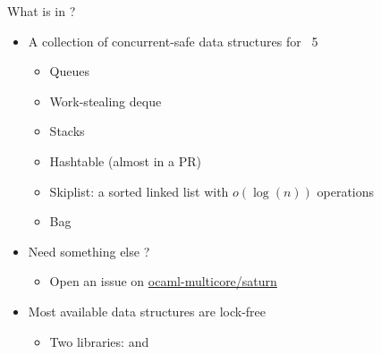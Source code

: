 \begin{frame}{What is in \Saturn ?}
    \begin{itemize}[label=$\bullet$]
        \item A collection of concurrent-safe data structures for \OCaml~5
        \begin{itemize}[label=$\diamond$]
           \item Queues
            \item<4-> Work-stealing deque
            \item<4-> Stacks 
            \item<4-> Hashtable (almost in a PR)
            \item<4-> Skiplist: a sorted linked list with $o(\log(n))$ operations
            \item<4-> Bag
        \end{itemize}
        \item<5-> Need something else ? 
        \begin{itemize}[label=$\rightarrow$]
            \item Open an issue on  \href{https://github.com/ocaml-multicore/saturn}{ocaml-multicore/saturn}
        \end{itemize}
        \item<6-> Most available data structures are lock-free 
        \begin{itemize}[label=$\rightarrow$]
            \item<6-> Two libraries: \Saturn and \Saturnlf
        \end{itemize}
    \end{itemize}
 \end{frame}


